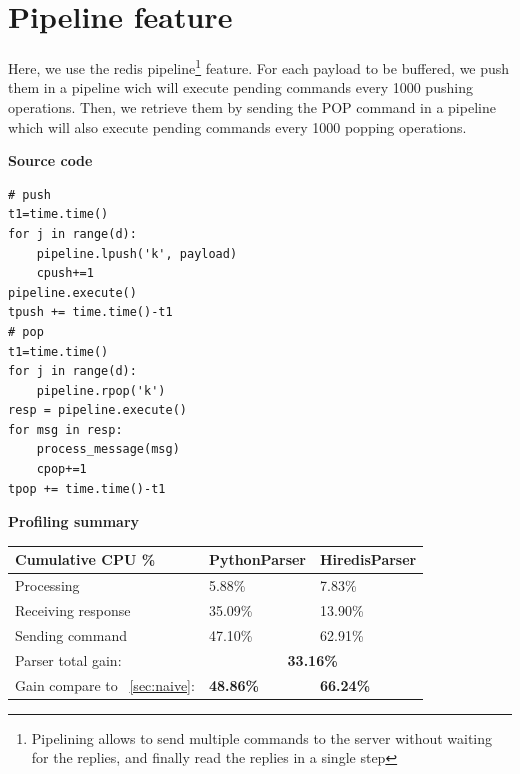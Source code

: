 \documentclass[a4paper, 11pt]{report}
\begin{document}
\newpage
\section{Pipeline feature\label{sec:pipeline}}
Here, we use the redis pipeline\footnote{Pipelining allows to send multiple commands to the server without waiting for the replies, and finally read the replies in a single step} feature.
For each payload to be buffered, we push them in a pipeline wich will execute pending commands every 1000 pushing operations. Then, we retrieve them by sending the POP command in a pipeline which will also execute pending commands every 1000 popping operations.\\

\begin{minipage}[t]{0.45\textwidth}
\textbf{Source code}\\
\vspace{-0.5em}
\begin{lstlisting}
# push
t1=time.time()
for j in range(d):
    pipeline.lpush('k', payload)
    cpush+=1
pipeline.execute()
tpush += time.time()-t1
# pop
t1=time.time()
for j in range(d):
    pipeline.rpop('k')
resp = pipeline.execute()
for msg in resp:
    process_message(msg)
    cpop+=1
tpop += time.time()-t1
\end{lstlisting}
\end{minipage}
\quad
\begin{minipage}[t]{0.5\textwidth}
\textbf{Profiling summary}\\

    \begin{tabular}{|l|l|l|}
        \hline
        Cumulative CPU \% & PythonParser & HiredisParser\\
        \hline
        Processing & 5.88\% & 7.83\%\\
        \hline
        Receiving response & 35.09\% & 13.90\%\\
        \hline
        Sending command & 47.10\% & 62.91\%\\
        \hline
        Parser total gain: & \multicolumn{2}{c|}{\textbf{33.16\%}}\\
        \hline
        Gain compare to ~\ref{sec:naive}: & \textbf{48.86\%} & \textbf{66.24\%}\\
        \hline
    \end{tabular}
\end{minipage}
\end{document}
